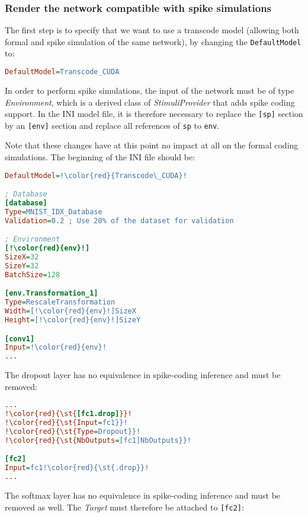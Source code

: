 \documentclass[a4paper,11pt,oneside]{article}
\begin{document}
\subsubsection{Render the network compatible with spike simulations}

The first step is to specify that we want to use
a transcode model (allowing both formal and spike simulation of the same
network), by changing the \lstinline!DefaultModel! to:

\begin{lstlisting}[language=ini]
DefaultModel=Transcode_CUDA
\end{lstlisting}

In order to perform spike simulations, the input of the network must be of type
\emph{Environment}, which is a derived class of
\emph{StimuliProvider} that adds spike coding support. In the INI model
file, it is therefore necessary to replace the \lstinline![sp]! section by an
\lstinline![env]! section and replace all references of \lstinline!sp! to
\lstinline!env!.

Note that these changes have at this point no impact at all on the formal coding
simulations. The beginning of the INI file should be:

\begin{lstlisting}[language=ini,escapechar=!]
DefaultModel=!\color{red}{Transcode\_CUDA}!

; Database
[database]
Type=MNIST_IDX_Database
Validation=0.2 ; Use 20% of the dataset for validation

; Environment
[!\color{red}{env}!]
SizeX=32
SizeY=32
BatchSize=128

[env.Transformation_1]
Type=RescaleTransformation
Width=[!\color{red}{env}!]SizeX
Height=[!\color{red}{env}!]SizeY

[conv1]
Input=!\color{red}{env}!
...
\end{lstlisting}

The dropout layer has no equivalence in spike-coding inference and must be
removed:

\begin{lstlisting}[language=ini,escapechar=!]
...
!\color{red}{\st{[fc1.drop]}}!
!\color{red}{\st{Input=fc1}}!
!\color{red}{\st{Type=Dropout}}!
!\color{red}{\st{NbOutputs=[fc1]NbOutputs}}!

[fc2]
Input=fc1!\color{red}{\st{.drop}}!
...
\end{lstlisting}

The softmax layer has no equivalence in spike-coding inference and must be
removed as well. The \emph{Target} must therefore be attached to
\lstinline![fc2]!:
\end{document}

